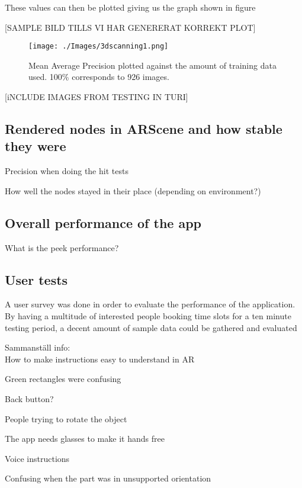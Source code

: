 These values can then be plotted giving us the graph shown in figure

[SAMPLE BILD TILLS VI HAR GENERERAT KORREKT PLOT]
\begin{figure}[hbtp]
\begin{center}
\texttt{[image: ./Images/3dscanning1.png]}
\caption{Mean Average Precision plotted against the amount of training data used. 100\% corresponds to 926 images.}
\label{fig:mAP}
\end{center}
\end{figure}

[iNCLUDE IMAGES FROM TESTING  IN TURI]

\subsection{Rendered nodes in ARScene and how stable they were}
Precision when doing the hit tests

How well the nodes stayed in their place (depending on environment?)

\subsection{Overall performance of the app}

What is the peek performance?

\subsection{User tests}

A user survey was done in order to evaluate the performance of the application. By having a multitude of interested people booking time slots for a ten minute testing period, a decent amount of sample data could be gathered and evaluated


Sammanställ info: \\

How to make instructions easy to understand in AR

Green rectangles were confusing

Back button?

People trying to rotate the object

The app needs glasses to make it hands free

Voice instructions

Confusing when the part was in unsupported orientation








\newpage